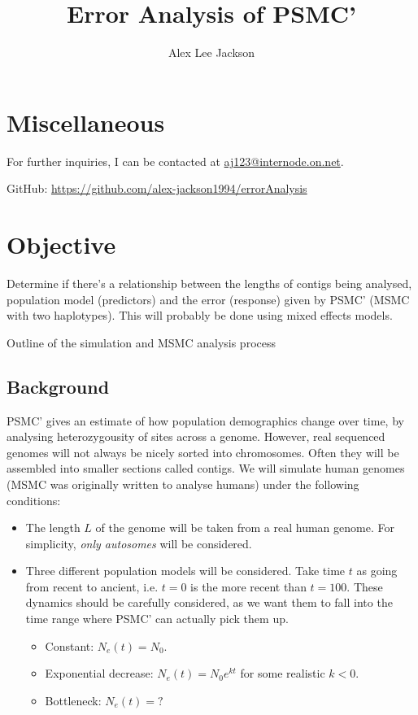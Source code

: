 \documentclass[11pt,a4paper]{article}
\title{Error Analysis of PSMC'}
\author{Alex Lee Jackson}
\begin{document}
\maketitle

%
\section{Miscellaneous}
For further inquiries, I can be contacted at \href{mailto:aj123@internode.on.net}{aj123@internode.on.net}.

GitHub: \url{https://github.com/alex-jackson1994/errorAnalysis}

\section{Objective}
Determine if there's a relationship between the lengths of contigs being analysed, population model (predictors) and the error (response) given by PSMC' (MSMC\cite{schiffels2014inferring} with two haplotypes). This will probably be done using mixed effects models.\\

\begin{algorithm}[H]
  \caption{Outline of the simulation and MSMC analysis process}\label{overall}
\end{algorithm}

\subsection{Background}
PSMC' gives an estimate of how population demographics change over time, by analysing heterozygousity of sites across a genome. However, real sequenced genomes will not always be nicely sorted into chromosomes. Often they will be assembled into smaller sections called contigs. We will simulate human genomes (MSMC was originally written to analyse humans) under the following conditions:
\begin{itemize}
\item The length $L$ of the genome will be taken from a real human genome. For simplicity, \emph{only autosomes} will be considered.
\item Three different population models will be considered. Take time $t$ as going from recent to ancient, i.e. $t=0$ is the more recent than $t=100$. These dynamics should be carefully considered, as we want them to fall into the time range where PSMC' can actually pick them up.
\begin{itemize}
\item Constant: $N_e(t)=N_0$.
\item Exponential decrease: $N_e(t)=N_0e^{kt}$ for some realistic $k<0$.
\item Bottleneck: $N_e(t)=?$
\end{itemize}
\end{itemize}
\end{document}
